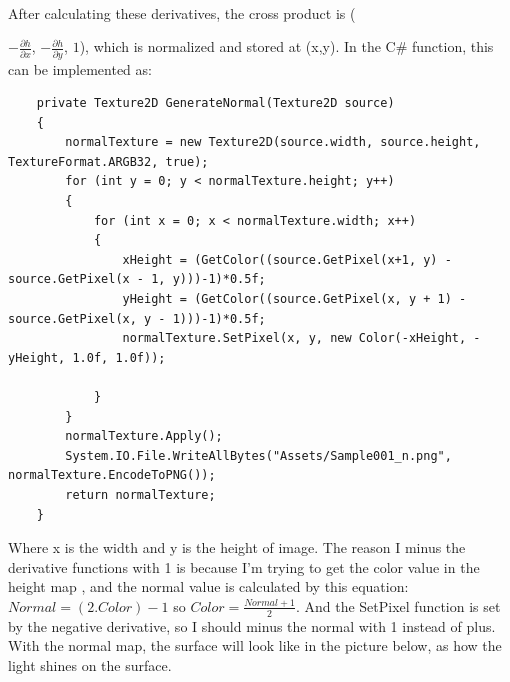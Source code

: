 \documentclass[a4paper, 13pt]{extarticle}
\begin{document}
\\[0.2cm] After calculating these derivatives, the cross product is ({$-\frac{\partial h}{\partial x}$, $-\frac{\partial h}{\partial y}$, $1$), which is normalized and stored at (x,y). In the C\# function, this can be implemented as: \begin{lstlisting}
	private Texture2D GenerateNormal(Texture2D source)
	{
		normalTexture = new Texture2D(source.width, source.height, TextureFormat.ARGB32, true);
		for (int y = 0; y < normalTexture.height; y++)
		{
			for (int x = 0; x < normalTexture.width; x++)
			{
				xHeight = (GetColor((source.GetPixel(x+1, y) - source.GetPixel(x - 1, y)))-1)*0.5f;
				yHeight = (GetColor((source.GetPixel(x, y + 1) - source.GetPixel(x, y - 1)))-1)*0.5f;
				normalTexture.SetPixel(x, y, new Color(-xHeight, -yHeight, 1.0f, 1.0f));
	
			}
		}
		normalTexture.Apply();
		System.IO.File.WriteAllBytes("Assets/Sample001_n.png", normalTexture.EncodeToPNG());
		return normalTexture;
	}
	\end{lstlisting}
 Where x is the width and y is the height of image. The reason I minus the derivative functions with 1 is because I'm trying to get the color value in the height map , and the normal value is calculated by this equation: $ Normal = (2.Color) - 1 $ so $ Color = \frac{Normal + 1}{2}$. And the SetPixel function is set by the negative derivative, so I should minus the normal with 1 instead of plus. With the normal map, the surface will look like in the picture below, as how the light shines on the surface.
 
}
\end{document}
